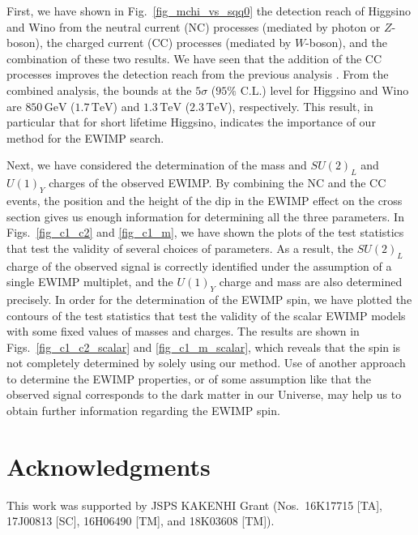 \documentclass[12pt, a4paper]{article}
\begin{document}
First, we have shown in Fig.~\ref{fig_mchi_vs_sqq0} the detection
reach of Higgsino and Wino from the neutral current (NC) processes
(mediated by photon or $Z$-boson), the charged current (CC) processes
(mediated by $W$-boson), and the combination of these two results.  We
have seen that the addition of the CC processes improves the detection
reach from the previous analysis \cite{Chigusa:2018vxz}.  From the
combined analysis, the bounds at the $5\sigma$ ($95\%$ C.L.) level for
Higgsino and Wino are $850\,\mathrm{GeV}$ ($1.7\,\mathrm{TeV}$) and
$1.3\,\mathrm{TeV}$ ($2.3\,\mathrm{TeV}$), respectively.  This result,
in particular that for short lifetime Higgsino, indicates the
importance of our method for the EWIMP search.

Next, we have considered the determination of the mass and $SU(2)_L$
and $U(1)_Y$ charges of the observed EWIMP.  By combining the NC and
the CC events, the position and the height of the dip in the EWIMP
effect on the cross section gives us enough information for
determining all the three parameters.  In Figs.~\ref{fig_c1_c2} and
\ref{fig_c1_m}, we have shown the plots of the test statistics that
test the validity of several choices of parameters.  As a result, the
$SU(2)_L$ charge of the observed signal is correctly identified under
the assumption of a single EWIMP multiplet, and the $U(1)_Y$ charge
and mass are also determined precisely.  In order for the
determination of the EWIMP spin, we have plotted the contours of the
test statistics that test the validity of the scalar EWIMP models with
some fixed values of masses and charges.  The results are shown in
Figs.~\ref{fig_c1_c2_scalar} and \ref{fig_c1_m_scalar}, which reveals
that the spin is not completely determined by solely using our
method.  Use of another approach to determine the EWIMP properties, or
of some assumption like that the observed signal corresponds to the
dark matter in our Universe, may help us to obtain further information
regarding the EWIMP spin.


\section*{Acknowledgments}

This work was supported by JSPS KAKENHI Grant (Nos.\ 16K17715 [TA], 17J00813 [SC],
16H06490 [TM], and 18K03608 [TM]).



\end{document}
